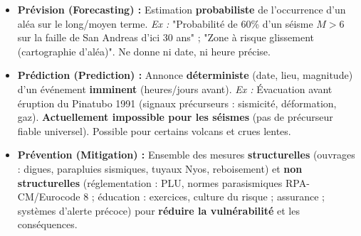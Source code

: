 \documentclass[11pt]{article}
\begin{document}
\begin{definition}
\begin{itemize}
    \item \textbf{Prévision (Forecasting) :} Estimation \textbf{probabiliste} de l'occurrence d'un aléa sur le long/moyen terme. \textit{Ex :} "Probabilité de 60\% d'un séisme $M>6$ sur la faille de San Andreas d'ici 30 ans" ; "Zone à risque glissement (cartographie d'aléa)". Ne donne ni date, ni heure précise.
    \item \textbf{Prédiction (Prediction) :} Annonce \textbf{déterministe} (date, lieu, magnitude) d'un événement \textbf{imminent} (heures/jours avant). \textit{Ex :} Évacuation avant éruption du Pinatubo 1991 (signaux précurseurs : sismicité, déformation, gaz). \textbf{Actuellement impossible pour les séismes} (pas de précurseur fiable universel). Possible pour certains volcans et crues lentes.
    \item \textbf{Prévention (Mitigation) :} Ensemble des mesures \textbf{structurelles} (ouvrages : digues, parapluies sismiques, tuyaux Nyos, reboisement) et \textbf{non structurelles} (réglementation : PLU, normes parasismiques RPA-CM/Eurocode 8 ; éducation : exercices, culture du risque ; assurance ; systèmes d'alerte précoce) pour \textbf{réduire la vulnérabilité} et les conséquences.
\end{itemize}
\end{definition}
\end{document}
